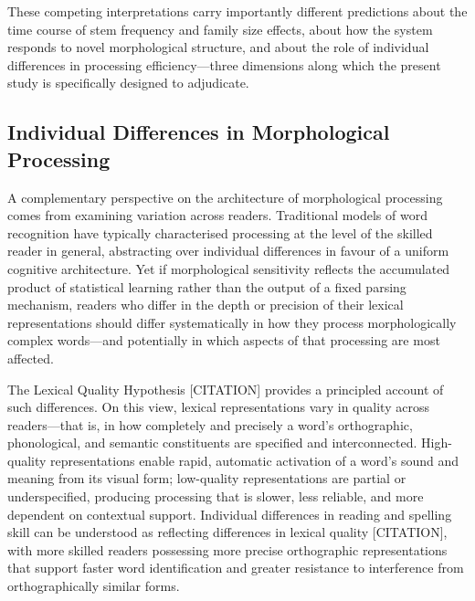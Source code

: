 \documentclass[utf8]{FrontiersinHarvard} %
\begin{document}
These competing interpretations carry importantly different predictions about the time course of stem frequency and family size effects, about how the system responds to novel morphological structure, and about the role of individual differences in processing efficiency—three dimensions along which the present study is specifically designed to adjudicate.

\subsection{Individual Differences in Morphological Processing}

A complementary perspective on the architecture of morphological processing comes from examining variation across readers. Traditional models of word recognition have typically characterised processing at the level of the skilled reader in general, abstracting over individual differences in favour of a uniform cognitive architecture. Yet if morphological sensitivity reflects the accumulated product of statistical learning rather than the output of a fixed parsing mechanism, readers who differ in the depth or precision of their lexical representations should differ systematically in how they process morphologically complex words—and potentially in which aspects of that processing are most affected.

The Lexical Quality Hypothesis [CITATION] provides a principled account of such differences. On this view, lexical representations vary in quality across readers—that is, in how completely and precisely a word's orthographic, phonological, and semantic constituents are specified and interconnected. High-quality representations enable rapid, automatic activation of a word's sound and meaning from its visual form; low-quality representations are partial or underspecified, producing processing that is slower, less reliable, and more dependent on contextual support. Individual differences in reading and spelling skill can be understood as reflecting differences in lexical quality [CITATION], with more skilled readers possessing more precise orthographic representations that support faster word identification and greater resistance to interference from orthographically similar forms.
\end{document}
